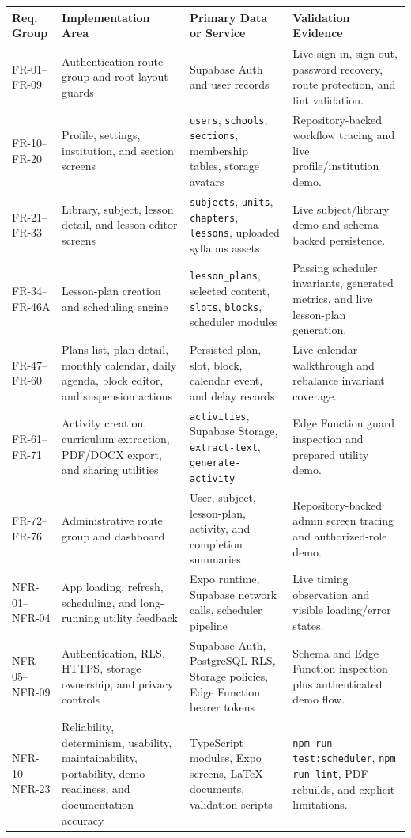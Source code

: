 \documentclass[12pt]{article}
\begin{document}
\begin{longtable}{|L{2.5cm}|L{3.4cm}|L{4.2cm}|L{3.6cm}|}
\hline
\textbf{Req. Group} & \textbf{Implementation Area} & \textbf{Primary Data or Service} & \textbf{Validation Evidence} \\
\hline
FR-01--FR-09 & Authentication route group and root layout guards & Supabase Auth and user records & Live sign-in, sign-out, password recovery, route protection, and lint validation. \\
\hline
FR-10--FR-20 & Profile, settings, institution, and section screens & \texttt{users}, \texttt{schools}, \texttt{sections}, membership tables, storage avatars & Repository-backed workflow tracing and live profile/institution demo. \\
\hline
FR-21--FR-33 & Library, subject, lesson detail, and lesson editor screens & \texttt{subjects}, \texttt{units}, \texttt{chapters}, \texttt{lessons}, uploaded syllabus assets & Live subject/library demo and schema-backed persistence. \\
\hline
FR-34--FR-46A & Lesson-plan creation and scheduling engine & \texttt{lesson\_plans}, selected content, \texttt{slots}, \texttt{blocks}, scheduler modules & Passing scheduler invariants, generated metrics, and live lesson-plan generation. \\
\hline
FR-47--FR-60 & Plans list, plan detail, monthly calendar, daily agenda, block editor, and suspension actions & Persisted plan, slot, block, calendar event, and delay records & Live calendar walkthrough and rebalance invariant coverage. \\
\hline
FR-61--FR-71 & Activity creation, curriculum extraction, PDF/DOCX export, and sharing utilities & \texttt{activities}, Supabase Storage, \texttt{extract-text}, \texttt{generate-activity} & Edge Function guard inspection and prepared utility demo. \\
\hline
FR-72--FR-76 & Administrative route group and dashboard & User, subject, lesson-plan, activity, and completion summaries & Repository-backed admin screen tracing and authorized-role demo. \\
\hline
NFR-01--NFR-04 & App loading, refresh, scheduling, and long-running utility feedback & Expo runtime, Supabase network calls, scheduler pipeline & Live timing observation and visible loading/error states. \\
\hline
NFR-05--NFR-09 & Authentication, RLS, HTTPS, storage ownership, and privacy controls & Supabase Auth, PostgreSQL RLS, Storage policies, Edge Function bearer tokens & Schema and Edge Function inspection plus authenticated demo flow. \\
\hline
NFR-10--NFR-23 & Reliability, determinism, usability, maintainability, portability, demo readiness, and documentation accuracy & TypeScript modules, Expo screens, LaTeX documents, validation scripts & \texttt{npm run test:scheduler}, \texttt{npm run lint}, PDF rebuilds, and explicit limitations. \\
\hline
\end{longtable}
\end{document}

